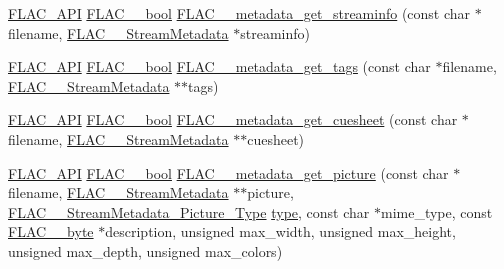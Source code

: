 \begin{DoxyCompactItemize}
\item 
\mbox{\hyperlink{group__flac__export_ga56ca07df8a23310707732b1c0007d6f5}{F\+L\+A\+C\+\_\+\+A\+PI}} \mbox{\hyperlink{ordinals_8h_a95103469f1cbd78b8cf250194985b34e}{F\+L\+A\+C\+\_\+\+\_\+bool}} \mbox{\hyperlink{group__flac__metadata__level0_gaf248d1ccc8025b9e9d7f532b8af4ab07}{F\+L\+A\+C\+\_\+\+\_\+metadata\+\_\+get\+\_\+streaminfo}} (const char $\ast$filename, \mbox{\hyperlink{struct_f_l_a_c_____stream_metadata}{F\+L\+A\+C\+\_\+\+\_\+\+Stream\+Metadata}} $\ast$streaminfo)
\item 
\mbox{\hyperlink{group__flac__export_ga56ca07df8a23310707732b1c0007d6f5}{F\+L\+A\+C\+\_\+\+A\+PI}} \mbox{\hyperlink{ordinals_8h_a95103469f1cbd78b8cf250194985b34e}{F\+L\+A\+C\+\_\+\+\_\+bool}} \mbox{\hyperlink{group__flac__metadata__level0_gaf66469f31dca28837ffd3f8b0ec5c082}{F\+L\+A\+C\+\_\+\+\_\+metadata\+\_\+get\+\_\+tags}} (const char $\ast$filename, \mbox{\hyperlink{struct_f_l_a_c_____stream_metadata}{F\+L\+A\+C\+\_\+\+\_\+\+Stream\+Metadata}} $\ast$$\ast$tags)
\item 
\mbox{\hyperlink{group__flac__export_ga56ca07df8a23310707732b1c0007d6f5}{F\+L\+A\+C\+\_\+\+A\+PI}} \mbox{\hyperlink{ordinals_8h_a95103469f1cbd78b8cf250194985b34e}{F\+L\+A\+C\+\_\+\+\_\+bool}} \mbox{\hyperlink{group__flac__metadata__level0_ga6ee2633dc179c2a0cb5fef5762faf0fd}{F\+L\+A\+C\+\_\+\+\_\+metadata\+\_\+get\+\_\+cuesheet}} (const char $\ast$filename, \mbox{\hyperlink{struct_f_l_a_c_____stream_metadata}{F\+L\+A\+C\+\_\+\+\_\+\+Stream\+Metadata}} $\ast$$\ast$cuesheet)
\item 
\mbox{\hyperlink{group__flac__export_ga56ca07df8a23310707732b1c0007d6f5}{F\+L\+A\+C\+\_\+\+A\+PI}} \mbox{\hyperlink{ordinals_8h_a95103469f1cbd78b8cf250194985b34e}{F\+L\+A\+C\+\_\+\+\_\+bool}} \mbox{\hyperlink{group__flac__metadata__level0_gaa13138ab038694909964998a113817b4}{F\+L\+A\+C\+\_\+\+\_\+metadata\+\_\+get\+\_\+picture}} (const char $\ast$filename, \mbox{\hyperlink{struct_f_l_a_c_____stream_metadata}{F\+L\+A\+C\+\_\+\+\_\+\+Stream\+Metadata}} $\ast$$\ast$picture, \mbox{\hyperlink{group__flac__format_gaf6d3e836cee023e0b8d897f1fdc9825d}{F\+L\+A\+C\+\_\+\+\_\+\+Stream\+Metadata\+\_\+\+Picture\+\_\+\+Type}} \mbox{\hyperlink{_s_d_l__opengl_8h_ad5ddf6fca7b585646515660e810e0188}{type}}, const char $\ast$mime\+\_\+type, const \mbox{\hyperlink{ordinals_8h_a5eb569b12d5b047cdacada4d57924ee3}{F\+L\+A\+C\+\_\+\+\_\+byte}} $\ast$description, unsigned max\+\_\+width, unsigned max\+\_\+height, unsigned max\+\_\+depth, unsigned max\+\_\+colors)
\end{DoxyCompactItemize}



